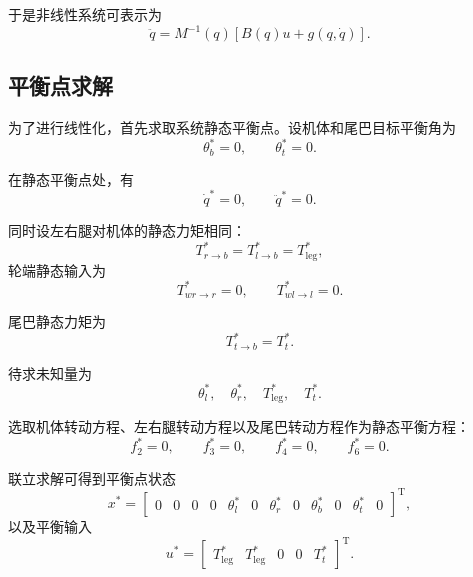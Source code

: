 \documentclass[UTF8,a4paper,12pt]{ctexart}
\begin{document}
于是非线性系统可表示为
\begin{equation}
    \ddot q
    =
    M^{-1}(q)
    \left[
        B(q)u + g(q,\dot q)
    \right].
\end{equation}

\subsection{平衡点求解}

为了进行线性化，首先求取系统静态平衡点。设机体和尾巴目标平衡角为
\begin{equation}
    \theta_b^\ast = 0,
    \qquad
    \theta_t^\ast = 0.
\end{equation}

在静态平衡点处，有
\begin{equation}
    \dot q^\ast = 0,
    \qquad
    \ddot q^\ast = 0.
\end{equation}

同时设左右腿对机体的静态力矩相同：
\begin{equation}
    T_{r \to b}^\ast = T_{l \to b}^\ast = T_{\mathrm{leg}}^\ast,
\end{equation}
轮端静态输入为
\begin{equation}
    T_{wr \to r}^\ast = 0,
    \qquad
    T_{wl \to l}^\ast = 0.
\end{equation}

尾巴静态力矩为
\begin{equation}
    T_{t \to b}^\ast = T_t^\ast.
\end{equation}

待求未知量为
\begin{equation}
    \theta_l^\ast,\quad
    \theta_r^\ast,\quad
    T_{\mathrm{leg}}^\ast,\quad
    T_t^\ast.
\end{equation}

选取机体转动方程、左右腿转动方程以及尾巴转动方程作为静态平衡方程：
\begin{equation}
    f_2^\ast = 0,
    \qquad
    f_3^\ast = 0,
    \qquad
    f_4^\ast = 0,
    \qquad
    f_6^\ast = 0.
\end{equation}

联立求解可得到平衡点状态
\begin{equation}
    x^\ast =
    \begin{bmatrix}
        0 &
        0 &
        0 &
        0 &
        \theta_l^\ast &
        0 &
        \theta_r^\ast &
        0 &
        \theta_b^\ast &
        0 &
        \theta_t^\ast &
        0
    \end{bmatrix}^{\mathrm T},
\end{equation}
以及平衡输入
\begin{equation}
    u^\ast =
    \begin{bmatrix}
        T_{\mathrm{leg}}^\ast &
        T_{\mathrm{leg}}^\ast &
        0 &
        0 &
        T_t^\ast
    \end{bmatrix}^{\mathrm T}.
\end{equation}
\end{document}

